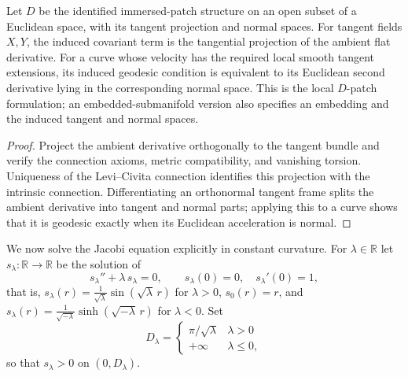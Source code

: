 \begin{lemma}
\label{lem:submanifold-connection}


Let $D$ be the identified immersed-patch structure on an open subset of a
Euclidean space, with its tangent projection and normal spaces. For tangent
fields $X,Y$, the induced covariant term is the tangential projection of the
ambient flat derivative. For a curve whose velocity has the required local
smooth tangent extensions, its induced geodesic condition is equivalent to
its Euclidean second derivative lying in the corresponding normal space. This
is the local $D$-patch formulation; an embedded-submanifold version also
specifies an embedding and the induced tangent and normal spaces.
\end{lemma}

\begin{proof}
\sketch
{}
Project the ambient derivative orthogonally to the tangent bundle and verify the connection axioms, metric compatibility, and vanishing torsion. Uniqueness of the Levi--Civita connection identifies this projection with the intrinsic connection. Differentiating an orthonormal tangent frame splits the ambient derivative into tangent and normal parts; applying this to a curve shows that it is geodesic exactly when its Euclidean acceleration is normal.
\end{proof}

We now solve the Jacobi equation explicitly in constant curvature.
For $\lambda\in\mathbb{R}$ let $s_\lambda\colon
\mathbb{R}\to\mathbb{R}$ be the solution of
$$s_\lambda''+\lambda\, s_\lambda=0,\qquad s_\lambda(0)=0,\quad
s_\lambda'(0)=1,$$
that is, $s_\lambda(r)=\frac{1}{\sqrt\lambda}\sin(\sqrt\lambda\,r)$
for $\lambda>0$, $s_0(r)=r$, and
$s_\lambda(r)=\frac{1}{\sqrt{-\lambda}}\sinh(\sqrt{-\lambda}\,r)$
for $\lambda<0$. Set
$$D_\lambda=\begin{cases}\pi/\sqrt{\lambda}&\lambda>0\\
+\infty&\lambda\le 0,\end{cases}$$
so that $s_\lambda>0$ on $(0,D_\lambda)$.

